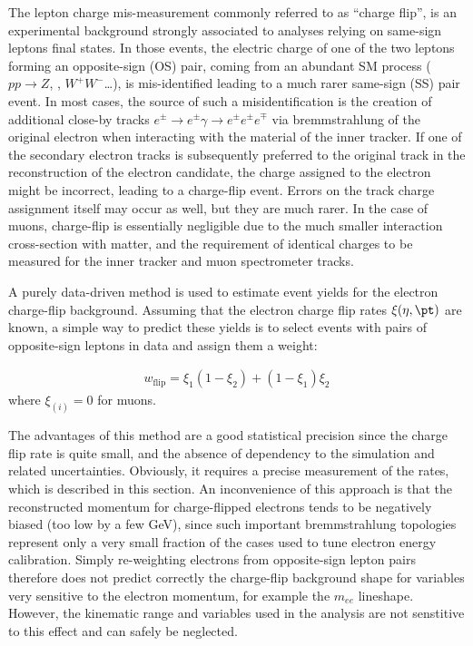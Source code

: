 The lepton charge mis-measurement commonly referred to as ``charge flip'', 
is an experimental background strongly associated to analyses relying on same-sign leptons final states. 
In those events, the electric charge of one of the two leptons forming an opposite-sign (OS) pair, 
coming from an abundant SM process ($pp\to Z$, \ttbar, $W^+W^-$\ldots), 
is mis-identified leading to a much rarer same-sign (SS) pair event.
In most cases, the source of such a misidentification 
is the creation of additional close-by tracks $e^\pm\to e^\pm\gamma\to e^\pm e^\pm e^\mp$ 
via bremmstrahlung of the original electron when interacting with the material of the inner tracker. 
If one of the secondary electron tracks is subsequently preferred to the original track in the reconstruction of the electron candidate, 
the charge assigned to the electron might be incorrect, leading to a charge-flip event. 
Errors on the track charge assignment itself may occur as well, but they are much rarer. 
In the case of muons, charge-flip is essentially negligible due to the much smaller interaction cross-section with matter, 
and the requirement of identical charges to be measured for the inner tracker and muon spectrometer tracks. 

A purely data-driven method is used to estimate event yields for the 
electron charge-flip background. 
Assuming that the electron charge flip rates $\xi(\eta,\pt)$ are known, 
a simple way to predict these yields is to select events with pairs of opposite-sign leptons in data and assign them a weight:

\begin{align}
w_\text{flip} = \xi_1(1-\xi_2) + (1-\xi_1)\xi_2
\label{eqn:chargeflip_weight}
\end{align}
where $\xi_{(i)}=0$ for muons.

The advantages of this method are a good statistical precision since the charge flip rate is quite small, 
and the absence of dependency to the simulation and related uncertainties. 
Obviously, it requires a precise measurement of the rates, which is described in this section. 
An inconvenience of this approach is that the reconstructed momentum for charge-flipped electrons  
tends to be negatively biased (too low by a few GeV), 
since such important bremmstrahlung topologies represent only 
a very small fraction of the cases used to tune electron energy calibration. 
Simply re-weighting electrons from opposite-sign lepton pairs therefore does not predict correctly 
the charge-flip background shape for variables very sensitive to the electron momentum, for example the $m_{ee}$ lineshape. 
However, the kinematic range and variables used in the analysis are not
senstitive to this effect and can safely be neglected.


